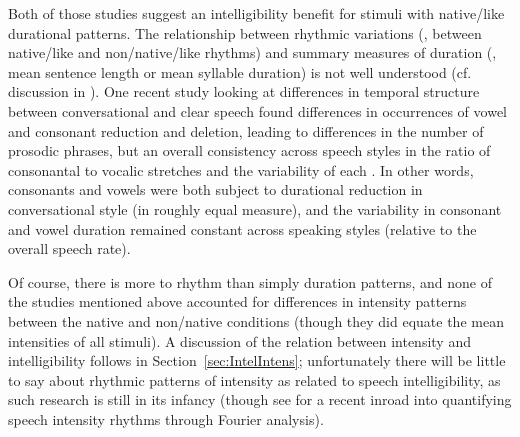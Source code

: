 Both of those studies suggest an intelligibility benefit for stimuli with native\-/like durational patterns.  The relationship between rhythmic variations (\eg, between native\-/like and non\-/native\-/like rhythms) and summary measures of duration (\eg, mean sentence length or mean syllable duration) is not well understood (cf. discussion in \citealt{Ramus2002}).  One recent study looking at differences in temporal structure between conversational and clear speech\footnotemark{} found differences in occurrences of vowel and consonant reduction and deletion, leading to differences in the number of prosodic phrases, but an overall consistency across speech styles in the ratio of consonantal to vocalic stretches and the variability of each \citep{SmiljanicBradlow2008}.  In other words, consonants and vowels were both subject to durational reduction in conversational style (in roughly equal measure), and the variability in consonant and vowel duration remained constant across speaking styles (relative to the overall speech rate).

Of course, there is more to rhythm than simply duration patterns, and none of the studies mentioned above %
accounted for differences in intensity patterns between the native and non\-/native conditions (though they did equate the mean intensities of all stimuli).  A discussion of the relation between intensity and intelligibility follows in Section~\ref{sec:IntelIntens}; unfortunately there will be little to say about rhythmic patterns of intensity as related to speech intelligibility, as such research is still in its infancy (though see \citealt{TilsenJohnson2008} for a recent inroad into quantifying speech intensity rhythms through Fourier analysis).

